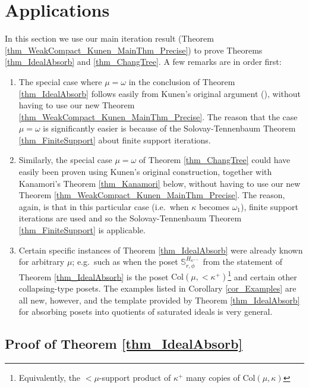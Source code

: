 \documentclass{amsart}
\begin{document}
\section{Applications}\label{sec_Apps}

In this section we use our main iteration result (Theorem \ref{thm_WeakCompact_Kunen_MainThm_Precise}) to prove Theorems \ref{thm_IdealAbsorb} and \ref{thm_ChangTree}.  A few remarks are in order first:  
\begin{enumerate}
 \item The special case where $\mu = \omega$ in the conclusion of Theorem \ref{thm_IdealAbsorb} follows easily from Kunen's original argument (\cite{MR495118}), without having to use our new Theorem \ref{thm_WeakCompact_Kunen_MainThm_Precise}.   The reason that the case $\mu = \omega$ is significantly easier is because of the Solovay-Tennenbaum Theorem \ref{thm_FiniteSupport} about finite support iterations.  
 \item Similarly, the special case $\mu = \omega$ of Theorem \ref{thm_ChangTree} could have easily been proven using Kunen's original construction, together with Kanamori's Theorem \ref{thm_Kanamori} below, without having to use our new Theorem \ref{thm_WeakCompact_Kunen_MainThm_Precise}.  The reason, again, is that in this particular case (i.e.\ when $\kappa$ becomes $\omega_1$), finite support iterations are used and so the Solovay-Tennenbaum Theorem \ref{thm_FiniteSupport} is applicable.
 \item Certain specific instances of Theorem \ref{thm_IdealAbsorb} were already known for arbitrary $\mu$; e.g.\ such as when the poset $\mathbb{S}^{H_{\kappa^{++}}}_{r,\phi}$ from the statement of Theorem \ref{thm_IdealAbsorb} is the poset $\text{Col}(\mu, < \kappa^+)$\footnote{Equivalently, the $<\mu$-support product of $\kappa^+$ many copies of $\text{Col}(\mu,\kappa)$} and certain other collapsing-type posets.  The examples listed in Corollary \ref{cor_Examples} are all new, however, and the template provided by Theorem \ref{thm_IdealAbsorb} for absorbing posets into quotients of saturated ideals is very general.
\end{enumerate}




\subsection{Proof of Theorem \ref{thm_IdealAbsorb}}
\end{document}
